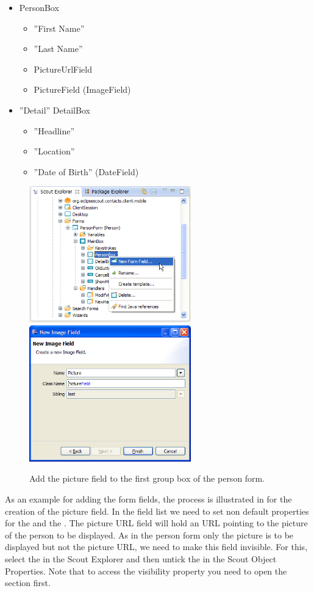 \documentclass[a4paper,10pt,twoside]{book}
\begin{document}
\begin{itemize}
  \item{PersonBox}
  \begin{itemize}
    \item ''First Name'' 
    \item ''Last Name''
    \item PictureUrlField
    \item PictureField (ImageField)
  \end{itemize} 
  \item{''Detail'' DetailBox}
  \begin{itemize}
    \item ''Headline'' 
    \item ''Location''
    \item ''Date of Birth'' (DateField)
  \end{itemize} 
\end{itemize} 

\begin{figure}
\includegraphics[width=7cm]{new_field_picture_contextmenu.png} \hspace{5mm}
\includegraphics[width=7cm]{new_field_picture.png}
\caption{Add the picture field to the first group box of the person form.}
\end{figure}

As an example for adding the form fields, the process is illustrated in  for the creation of the picture field. 
In the field list we need to set non default properties for the  and the . 
The picture URL field will hold an URL pointing to the picture of the person to be displayed. 
As in the person form only the picture is to be displayed but not the picture URL, we need to make this field invisible. 
For this, select the  in the Scout Explorer and then untick the  in the Scout Object Properties. 
Note that to access the visibility property you need to open the section  first. 
\end{document}
